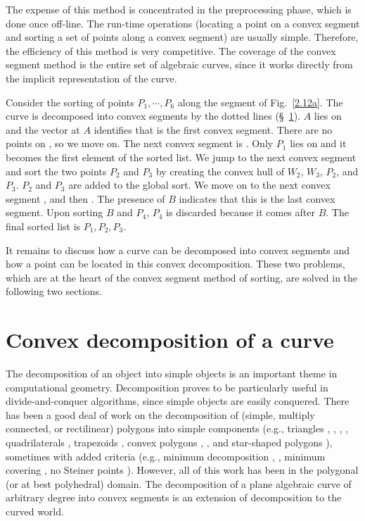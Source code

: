 \vspace{.2in}

The expense of this method is concentrated in the preprocessing phase, which
is done once off-line. 
The run-time operations (locating a point on a convex segment and
sorting a set of points along a convex segment) are usually simple.
Therefore, the efficiency of this method is very competitive.
The coverage of the convex segment method is the entire set of algebraic curves,
since it works directly from the implicit representation of the curve.


\begin{example}
{\rm
Consider the sorting of points $P_{1}, \cdots, P_{6}$ 
along the segment  of Fig.~\ref{2.12a}.
The curve is decomposed into convex segments by the dotted lines 
(\S~\ref{s-dec}).
$A$ lies on  and
the vector at $A$ identifies that  is the first convex segment.
There are no points on , so we move on.
The next convex segment is \arc{\wo\wt}.
Only $P_{1}$ lies on \arc{\wo\wt} and it becomes the first element of the 
sorted list.
We jump to the next convex segment  and
sort the two points $P_{2}$ and $P_{3}$ 
by creating the convex hull of $W_{2}$, $W_{3}$, $P_{2}$, and $P_{3}$.
$P_{2}$ and $P_{3}$ are added to the global sort.
We move on to the next convex segment , and then .
The presence of $B$ indicates that this is the last convex segment.
Upon sorting $B$ and $P_{4}$, $P_{4}$ is discarded because it comes after $B$.
The final sorted list is $P_{1},P_{2},P_{3}$.
}
\end{example}

It remains to discuss how a curve can be decomposed into convex segments and
how a point can be located in this convex decomposition.
These two problems, which are at the heart of the convex segment method 
of sorting, are solved in the following two sections.

\section{Convex decomposition of a curve}
\label{s-dec}
%
The decomposition of an object into simple objects is an important theme
in computational geometry.
Decomposition proves to be particularly useful in divide-and-conquer algorithms, 
since simple objects are easily conquered.
There has been a good deal of work on the decomposition of 
(simple, multiply connected, or rectilinear) polygons into simple components
(e.g., triangles \cite{CI}, \cite{G}, \cite{H}, \cite{T}, quadrilaterals \cite{S}, 
trapezoids \cite{As}, convex polygons  \cite{cd}, \cite{tm}, and star-shaped 
polygons \cite{Av}), sometimes with added criteria (e.g., minimum decomposition 
\cite{cd}, \cite{keil}, minimum covering \cite{O}, no Steiner points \cite{keil}).
However, all of this work has been in the polygonal (or at best polyhedral) 
domain.
The decomposition of a plane algebraic curve of arbitrary degree into convex 
segments is an extension of decomposition to the curved world.

